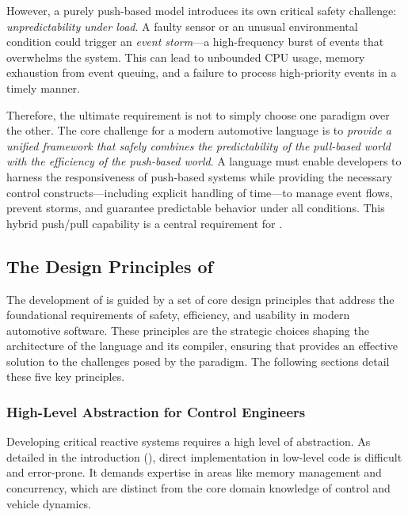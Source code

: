 However, a purely push-based model introduces its own critical safety challenge:
\emph{unpredictability under load}. A faulty sensor or an unusual environmental condition could
trigger an \emph{event storm}---a high-frequency burst of events that overwhelms the system. This
can lead to unbounded CPU usage, memory exhaustion from event queuing, and a failure to process
high-priority events in a timely manner.

Therefore, the ultimate requirement is not to simply choose one paradigm over the other. The core
challenge for a modern automotive language is to \emph{provide a unified framework that safely
    combines the predictability of the pull-based world with the efficiency of the push-based
    world}. A language must enable developers to harness the responsiveness of push-based systems
while providing the necessary control constructs---including explicit handling of time---to manage
event flows, prevent storms, and guarantee predictable behavior under all conditions. This hybrid
push/pull capability is a central requirement for \GRust.

\subsection{The Design Principles of \GRust}
\label{sec:grust:implem:design_principles}

The development of \GRust is guided by a set of core design principles that
address the foundational requirements of safety, efficiency, and usability in modern
automotive software. These principles are the strategic choices shaping the
architecture of the language and its compiler, ensuring that \GRust provides an
effective solution to the challenges posed by the \sdv paradigm. The following
sections detail these five key principles.

\subsubsection{High-Level Abstraction for Control Engineers}
\label{sec:grust:implem:design_principles:abstraction}

Developing critical reactive systems requires a high level of abstraction. As detailed in the
introduction (), direct implementation in low-level code is difficult and
error-prone. It demands expertise in areas like memory management and concurrency, which are
distinct from the core domain knowledge of control and vehicle dynamics.

